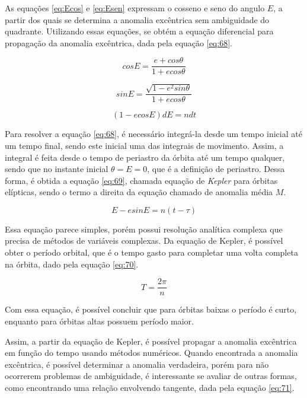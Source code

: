 As equações \ref{eq:Ecos} e \ref{eq:Esen} expressam o cosseno  e seno do angulo $E$, a partir dos quais se determina a anomalia excêntrica sem ambiguidade do quadrante. Utilizando essas equações, se obtém a equação diferencial para propagação da anomalia excêntrica, dada pela equação \ref{eq:68}.

\begin{equation}
    cos E = \frac{e+cos\theta}{1+ecos\theta}
    \label{eq:Ecos}
\end{equation}

\begin{equation}
    sin E = \frac{\sqrt{1-e^{2} sin \theta}}{1+ecos\theta}
    \label{eq:Esen}
\end{equation}


\begin{equation}
    (1-ecosE)dE = ndt
    \label{eq:68}
\end{equation}

Para resolver a equação \ref{eq:68}, é necessário integrá-la desde um tempo inicial até um tempo final, sendo este inicial uma das integrais de movimento. Assim, a integral é feita desde o tempo de periastro da órbita até um tempo qualquer, sendo que no instante inicial $\theta = E = 0$, que é a definição de periastro. Dessa forma, é obtida a equação \ref{eq:69}, chamada equação de \textit{Kepler} para órbitas elípticas, sendo o termo a direita da equação chamado de anomalia média $M$.

\begin{equation}
    E - esinE = n(t -\tau)
    \label{eq:69}
\end{equation}

Essa equação parece simples, porém possui resolução analítica complexa que precisa de métodos de variáveis complexas. Da equação de Kepler, é possível obter o período orbital, que é o tempo gasto para completar uma volta completa na órbita, dado pela equação \ref{eq:70}.

\begin{equation}
    T = \frac{2\pi}{n}
    \label{eq:70}
\end{equation}

Com essa equação, é possível concluir que para órbitas baixas o período é curto, enquanto para órbitas altas possuem período maior.

Assim, a partir da equação de Kepler, é possível propagar a anomalia excêntrica em função do tempo usando métodos numéricos. Quando encontrada a anomalia excêntrica, é possível determinar a anomalia verdadeira, porém para não ocorrerem problemas de ambiguidade, é interessante se avaliar de outras formas, como encontrando uma relação envolvendo tangente, dada pela equação \ref{eq:71}.

